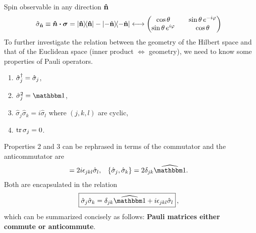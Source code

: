 Spin observable in any direction ${\bf \hat{n}}$
\begin{align}
	\hat\sigma_{\bf \hat n} \equiv \boldsymbol{\hat n\cdot\sigma} = \dyad{\bf \hat n} - \dyad{-\hat {\bf n}} \longleftrightarrow \mqty(\cos\theta && \sin\theta\,e^{-i\varphi} \\ \sin\theta\,e^{i \varphi} && \cos\theta) 
\end{align}
To further investigate the relation between the geometry of the Hilbert space and that of the Euclidean space (inner product $\iff$ geometry), we need to know some properties of Pauli operators.

\vspace{0.5em}
\begin{enumerate}
	\item $\hat\sigma_j^{\dagger} = \hat\sigma_j$,
	\item $\hat\sigma_j^2 = \id$,
	\item $\hat\sigma_j \hat\sigma_k = i\hat\sigma_l$ where $(j,k,l)$ are cyclic,
	\item $\tr\sigma_j = 0$.
\end{enumerate}
Properties 2 and 3 can be rephrased in terms of the commutator and the anticommutator are
\begin{align}
	[\hat\sigma_j,\hat\sigma_k] = 2i\epsilon_{jkl}\hat\sigma_l, &&
	\{\hat\sigma_j,\hat\sigma_k\} = 2\delta_{jk}\op\id.
\end{align}
Both are encapsulated in the relation
\begin{align}\label{eq:pauli-algebraic}
	\boxed{\hat\sigma_j \hat\sigma_k = \delta_{jk}\op\id + i\epsilon_{jkl}\hat\sigma_l}\, ,
\end{align}
which can be summarized concisely as follows: {\bf Pauli matrices either commute or anticommute}.

